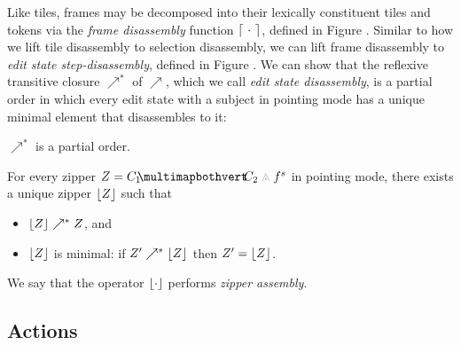 
% 
% 



Like tiles, frames may be decomposed into their
lexically constituent tiles and tokens via the
\emph{frame disassembly} function $\left\lceil~\cdot~\right\rceil$,
defined in Figure .
Similar to how we lift tile disassembly to selection
disassembly, we can lift frame disassembly to
\emph{edit state step-disassembly}, defined in Figure .
We can show that the reflexive transitive closure
$\nearrow^*$ of $\nearrow$, which we call \emph{edit state disassembly},
is a partial order in
which every edit state with a subject in pointing mode
has a unique minimal element that disassembles to it:
\begin{lemma}
  $\nearrow^*$ is a partial order.
\end{lemma}
\begin{lemma}\label{lemma:unique-parsed-editstate}
  For every zipper $\editState = \zipper{\pointing{\selection_1}{\selection_2}}{\tfrelem^s}$
  in pointing mode,
  there exists a unique zipper $\left\lfloor Z\right\rfloor$ such that
  \begin{itemize}
  \item $\left\lfloor Z\right\rfloor \nearrow^* Z$, and
  \item $\left\lfloor Z\right\rfloor$ is minimal: if $Z' \nearrow^* \left\lfloor Z\right\rfloor$ then $Z' = \left\lfloor Z\right\rfloor$.
  \end{itemize}
\end{lemma}
\noindent
We say that the operator $\left\lfloor\cdot\right\rfloor$ performs \emph{zipper assembly}.



\subsection{Actions} \label{sec:actions}

